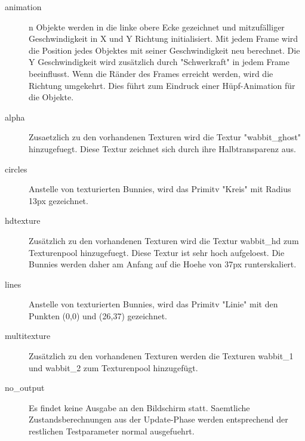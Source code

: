 \begin{description}
\item[animation] n Objekte werden in die linke obere Ecke gezeichnet und mitzufälliger Geschwindigkeit in X und Y Richtung initialisiert. Mit jedem Frame wird die Position jedes Objektes mit seiner Geschwindigkeit neu berechnet. Die Y Geschwindigkeit wird zusätzlich durch "Schwerkraft" in jedem Frame beeinflusst. Wenn die Ränder des Frames erreicht werden, wird die Richtung umgekehrt. Dies führt zum Eindruck einer Hüpf-Animation für die Objekte. \\
\item[alpha]Zusaetzlich zu den vorhandenen Texturen wird die Textur "wabbit\_ghost" hinzugefuegt. Diese Textur zeichnet sich durch ihre Halbtransparenz aus. \\                                                                                                                                                                                                                                                                                                
\item[circles] Anstelle von texturierten Bunnies, wird das Primitv "Kreis" mit Radius 13px gezeichnet. \\                                                                                                                                                                          
\item[hdtexture] Zusätzlich zu den vorhandenen Texturen wird die Textur wabbit\_hd zum Texturenpool hinzugefuegt. Diese Textur ist sehr hoch aufgeloest. Die Bunnies werden daher am Anfang auf die Hoehe von 37px runterskaliert. \\
\item[lines]Anstelle von texturierten Bunnies, wird das Primitv "Linie" mit den Punkten (0,0) und (26,37) gezeichnet. \\                                                                                                                                                                                                                                                                                                                                     
\item[multitexture] Zusätzlich zu den vorhandenen Texturen werden die Texturen wabbit\_1 und wabbit\_2 zum Texturenpool hinzugefügt. \\
\item[no\_output] Es findet keine Ausgabe an den Bildschirm statt. Saemtliche Zustandsberechnungen aus der Update-Phase werden entsprechend der restlichen Testparameter normal ausgefuehrt. \\                                                                                                                                                                                                                                                                     

\end{description}
